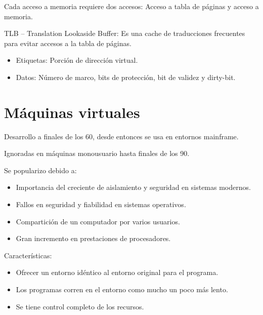 \documentclass[12pt, twoside, openright]{report} %
\begin{document}
  
    Cada acceso a memoria requiere dos accesos: Acceso a tabla de
    páginas y acceso a memoria.

    TLB -- Translation Lookaside Buffer: Es una cache de traducciones
    frecuentes para evitar accesos a la tabla de páginas.

    \begin{itemize}
    
    \item
      Etiquetas: Porción de dirección virtual.
    \item
      Datos: Número de marco, bits de protección, bit de validez y
      dirty-bit.
    \end{itemize}

    \pagebreak
\section{Máquinas virtuales}

    Desarrollo a finales de los 60, desde entonces se usa en entornos
    mainframe.

    
  Ignoradas en máquinas monousuario hasta finales de los 90.

  
    Se popularizo debido a:
    \vspace{-0.5cm}

    \begin{itemize}
    
    \item
      Importancia del creciente de aislamiento y seguridad en sistemas
      modernos.
    \item
      Fallos en seguridad y fiabilidad en sistemas operativos.
    \item
      Compartición de un computador por varios usuarios.
    \item
      Gran incremento en prestaciones de procesadores.
    \end{itemize}

    Características:
    \vspace{-0.5cm}

    \begin{itemize}
    
    \item
      Ofrecer un entorno idéntico al entorno original para el programa.
    \item
      Los programas corren en el entorno como mucho un poco más lento.
    \item
      Se tiene control completo de los recursos.
    \end{itemize}
\end{document}
